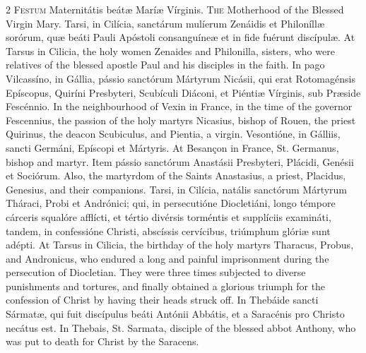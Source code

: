 \begin{paracol}{2}
\lettrine[lines=1]{F}{estum} Maternitátis beátæ Maríæ Vírginis.
\switchcolumn
{}
\lettrine[lines=1]{T}{he} Motherhood of the Blessed Virgin Mary.
\switchcolumn*
{}
Tarsi, in Cilícia, sanctárum mulíerum Zenáidis et Philoníllæ sorórum, quæ beáti Pauli Apóstoli 
 consanguíneæ et in fide fuérunt discípulæ.
\switchcolumn
{}
At Tarsus in Cilicia, the holy women 
 Zenaides and Philonilla, sisters, who were relatives of the blessed apostle 
 Paul and his disciples in the faith.
\switchcolumn*
{}
In pago Vilcassíno, in 
 Gállia, pássio sanctórum Mártyrum Nicásii, qui erat Rotomagénsis Epíscopus, 
 Quiríni Presbyteri, Scubículi Diáconi, et Piéntiæ Vírginis, sub Præside 
 Fescénnio.
\switchcolumn
{}
In the neighbourhood of Vexin in 
 France, in the time of the governor Fescennius, the passion of the holy 
 martyrs Nicasius, bishop of Rouen, the priest Quirinus, the deacon 
 Scubiculus, and Pientia, a virgin.
\switchcolumn*
{}
Vesontióne, in Gálliis, 
 sancti Germáni, Epíscopi et Mártyris.
\switchcolumn
{}
At Besançon in France, St. Germanus, 
 bishop and martyr.
\switchcolumn*
{}
Item pássio sanctórum 
 Anastásii Presbyteri, Plácidi, Genésii et Sociórum.
\switchcolumn
{}
Also, the martyrdom of the Saints 
 Anastasius, a priest, Placidus, Genesius, and their companions.
\switchcolumn*
{}
Tarsi, in Cilícia, natális sanctórum Mártyrum Tháraci, Probi et Andrónici; qui, in persecutióne 
 Diocletiáni, longo témpore cárceris squalóre afflícti, et tértio divérsis 
 torméntis et supplíciis examináti, tandem, in confessióne Christi, abscíssis 
 cervícibus, triúmphum glóriæ sunt adépti.
\switchcolumn
{}
At Tarsus in Cilicia, the birthday 
 of the holy martyrs Tharacus, Probus, and Andronicus, who endured a long and 
 painful imprisonment during the persecution of Diocletian. They were 
 three times subjected to diverse punishments and tortures, and finally 
 obtained a glorious triumph for the confession of Christ by having their 
 heads struck off.
\switchcolumn*
{}
In Thebáide sancti 
 Sármatæ, qui fuit discípulus beáti Antónii Abbátis, et a Saracénis pro 
 Christo necátus est.
\switchcolumn
{}
In Thebais, St. Sarmata, disciple of 
 the blessed abbot Anthony, who was put to death for Christ by the Saracens.
\switchcolumn*
{}

\end{paracol}
